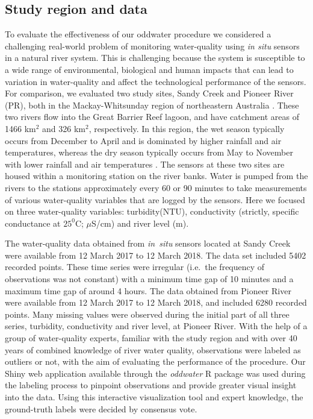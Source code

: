\documentclass[draft]{agujournal2018} %
\begin{document}
\subsection{Study region and data}\label{study-region-and-data}

To evaluate the effectiveness of our \color{black} oddwater procedure \color{black} we considered a
challenging real-world problem of monitoring water-quality using \emph{in situ} sensors in a natural river system. This is
challenging because the system is susceptible to a wide range of
environmental, biological and human impacts that can lead to variation
in water-quality and affect the technological performance of the
sensors. For comparison, we evaluated two study sites, Sandy Creek and
Pioneer River (PR), both in the Mackay-Whitsunday region of northeastern
Australia \citep{mitchell2005sediments}. These two rivers flow into
the Great Barrier Reef lagoon, and have catchment areas of 1466 km\(^2\)
and 326 km\(^2\), respectively. In this region, the wet season typically
occurs from December to April and is dominated by higher rainfall and
air temperatures, whereas the dry season typically occurs from May to
November with lower rainfall and air temperatures
\citep{mcinnes2015wet}. The sensors at these two sites are housed
within a monitoring station on the river banks. Water is pumped from the rivers to the stations approximately every 60 or 90 minutes to
take measurements of various water-quality variables that are logged by
the sensors. Here we focused on three water-quality variables: turbidity(NTU), \color{black} conductivity (strictly, specific conductance at \(25^0\)C; \(\mu\)S/cm) \color{black} and river level (m).

The water-quality data obtained from \emph{in~situ} sensors located at
Sandy Creek were available from 12 March 2017 to 12 March 2018. The data
set included 5402 recorded points. These time series were irregular
(i.e.~the frequency of observations was not constant) with a minimum
time gap of 10 minutes and a maximum time gap of around 4 hours. The data
obtained from Pioneer River were available from 12 March 2017 to 12
March 2018, and included 6280 recorded points. Many missing values were
observed during the initial part of all three series, turbidity, conductivity and river level, at Pioneer River. \color{black}  With the help of a group of water-quality experts, familiar with the study region and with over 40 years of combined knowledge of river water quality, observations were labeled as outliers or not, with the aim of evaluating the performance of the procedure. Our Shiny web application available through the \emph{oddwater} R package was  used during the labeling process to pinpoint observations and provide greater visual insight into the data. Using this interactive visualization tool and expert knowledge, the ground-truth labels were decided by consensus vote. \color{black}
\end{document}

